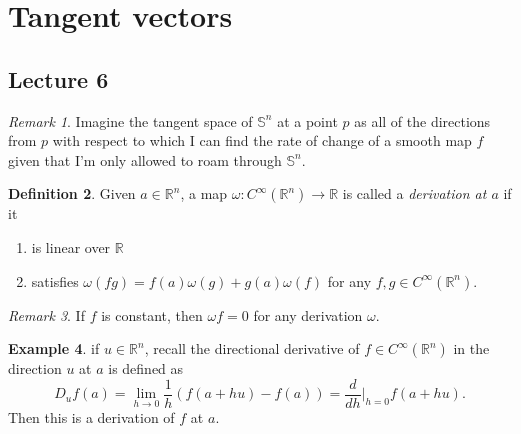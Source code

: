 \documentclass[10pt,letterpaper,cm]{nupset}
\theoremstyle{definition}
\newtheorem{definition}{Definition}[subsection]
\newtheorem{exmp}[definition]{Example}
\theoremstyle{theorem}
\theoremstyle{remark}
\newtheorem{remark}[definition]{Remark}
\newcommand{\R}{\mathbb R}
\renewcommand{\S}{\mathbb S}
\newcommand{\1}{\mathbf{1}}
\newcommand{\0}{\vec 0}
\begin{document}
\section{Tangent vectors}

\subsection{Lecture 6}

\begin{remark}
Imagine the tangent space of $\S^n$ at a point $p$ as all of the directions from $p$ with respect to which I can find the rate of change of a smooth map $f$ given that I'm only allowed to roam through $\S^n$. 
\end{remark}


\begin{definition}
Given $a \in \R^n$, a map $\omega: C^{\infty}(\R^n) \to \R$ is called a \textit{derivation at $a$} if it
\begin{enumerate}[label=\alph*.]
\item is linear over $\R$
\item satisfies $\omega(fg) = f(a)\omega(g) + g(a) \omega(f)$ for any $f, g \in C^{\infty}(\R^n)$. 
\end{enumerate}
\end{definition}

\begin{remark}
If $f$ is constant, then $\omega f =0$ for any derivation $\omega$.
\end{remark}

\begin{exmp}
if $u \in \R^n$, recall the directional derivative of $f\in C^{\infty}(\R^n)$ in the direction $u$ at $a$ is defined as $$D_uf(a) = \lim_{h \to 0} \frac{1}{h}(f(a+hu) -f(a)) = \frac{d}{d{h}}\rvert_{h=0} f(a+hu).$$ Then this is a derivation of $f$ at $a$. 
\end{exmp}
\end{document}
